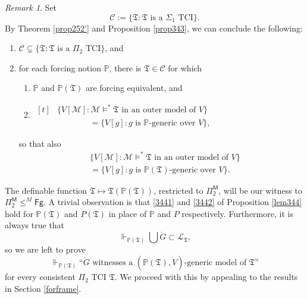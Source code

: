 \documentclass[12pt, twoside]{memoir}
\numberwithin{equation}{section}
\theoremstyle{definition}
\theoremstyle{remark}
\newtheorem{rem}[thm]{Remark}
\theoremstyle{definition}
\theoremstyle{definition}
\theoremstyle{definition}
\theoremstyle{remark}
\begin{document}
\begin{rem}
Set
\begin{equation*}
    \mathcal{C} := \{\mathfrak{T} : \mathfrak{T} \text{ is a } \Sigma_1 \text{ TCI}\} \text{.}
\end{equation*}
By Theorem \ref{prop252'} and Proposition \ref{prop343}, we can conclude the following:
\begin{enumerate}[label=(\arabic*)]
    \item $\mathcal{C} \subsetneq \{\mathfrak{T} : \mathfrak{T} \text{ is a } \Pi_2 \text{ TCI}\}$, and
    \item for each forcing notion $\mathbb{P}$, there is $\mathfrak{T} \in \mathcal{C}$ for which
    \begin{enumerate}[label=(\alph*)]
        \item $\mathbb{P}$ and $\mathbb{P}(\mathfrak{T})$ are forcing equivalent, and
        \item 
        \!
        $\begin{aligned}[t]
            & \{V[\mathcal{M}] : \mathcal{M} \models^* \mathfrak{T} \text{ in an outer model of } V\} \\
            & \mspace{70mu} = \{V[g] : g \text{ is } \mathbb{P} \text{-generic over } V\} \text{,}
        \end{aligned}$
    \end{enumerate}
    so that also
    \begin{align*}
        & \{V[\mathcal{M}] : \mathcal{M} \models^* \mathfrak{T} \text{ in an outer model of } V\} \\
        & = \{V[g] : g \text{ is } \mathbb{P}(\mathfrak{T}) \text{-generic over } V\} \text{.}
    \end{align*}
\end{enumerate} 
\end{rem}

The definable function $\mathfrak{T} \mapsto \mathfrak{T}(\mathbb{P}(\mathfrak{T}))$, restricted to $\mathsf{\Pi^M_2}$, will be our witness to $\mathsf{\Pi^M_2} \leq^M \mathsf{Fg}$. A trivial observation is that \ref{3441} and \ref{3442} of Proposition \ref{lem344} hold for $\mathbb{P}(\mathfrak{T})$ and $P(\mathfrak{T})$ in place of $\mathbb{P}$ and $P$ respectively. Furthermore, it is always true that
\begin{equation*}
    \Vdash_{\mathbb{P}(\mathfrak{T})} \bigcup \dot{G} \subset \mathcal{L}_{\mathfrak{T}} \text{,}
\end{equation*}
so we are left to prove
\begin{equation}\label{32}
    \Vdash_{\mathbb{P}(\mathfrak{T})} \text{``} \dot{G} \text{ witnesses a } (\mathbb{P}(\mathfrak{T}), \dot{V}) \text{-generic model of } \mathfrak{T} \text{''}
\end{equation}
for every consistent $\Pi_2$ TCI $\mathfrak{T}$. We proceed with this by appealing to the results in Section \ref{forframe}. 
\end{document}

